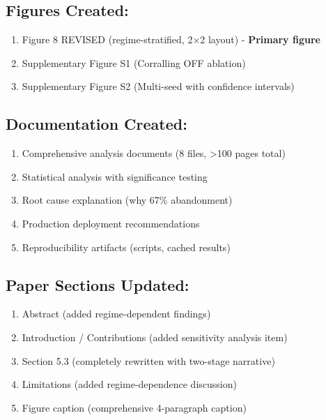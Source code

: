 \subsection*{Figures Created:}
\begin{enumerate}[leftmargin=*, itemsep=2pt]
    \item Figure 8 REVISED (regime-stratified, 2×2 layout) - \textbf{Primary figure}
    \item Supplementary Figure S1 (Corralling OFF ablation)
    \item Supplementary Figure S2 (Multi-seed with confidence intervals)
\end{enumerate}

\subsection*{Documentation Created:}
\begin{enumerate}[leftmargin=*, itemsep=2pt]
    \item Comprehensive analysis documents (8 files, >100 pages total)
    \item Statistical analysis with significance testing
    \item Root cause explanation (why 67\% abandonment)
    \item Production deployment recommendations
    \item Reproducibility artifacts (scripts, cached results)
\end{enumerate}

\subsection*{Paper Sections Updated:}
\begin{enumerate}[leftmargin=*, itemsep=2pt]
    \item Abstract (added regime-dependent findings)
    \item Introduction / Contributions (added sensitivity analysis item)
    \item Section 5.3 (completely rewritten with two-stage narrative)
    \item Limitations (added regime-dependence discussion)
    \item Figure caption (comprehensive 4-paragraph caption)
\end{enumerate}


